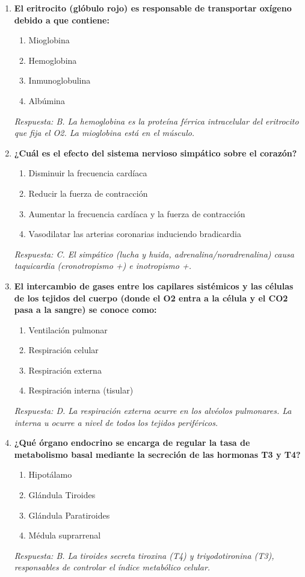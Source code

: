 \documentclass[spanish,letterpaper,oneside]{article}
\begin{document}
\begin{enumerate}[label=\textbf{\arabic*.}]
    \item \textbf{El eritrocito (glóbulo rojo) es responsable de transportar oxígeno debido a que contiene:}
    \begin{enumerate}
        \item[A)] Mioglobina
        \item[B)] Hemoglobina
        \item[C)] Inmunoglobulina
        \item[D)] Albúmina
    \end{enumerate}
    \textit{Respuesta: B. La hemoglobina es la proteína férrica intracelular del eritrocito que fija el O2. La mioglobina está en el músculo.}

    \item \textbf{¿Cuál es el efecto del sistema nervioso simpático sobre el corazón?}
    \begin{enumerate}
        \item[A)] Disminuir la frecuencia cardíaca
        \item[B)] Reducir la fuerza de contracción
        \item[C)] Aumentar la frecuencia cardíaca y la fuerza de contracción
        \item[D)] Vasodilatar las arterias coronarias induciendo bradicardia
    \end{enumerate}
    \textit{Respuesta: C. El simpático (lucha y huida, adrenalina/noradrenalina) causa taquicardia (cronotropismo +) e inotropismo +.}

    \item \textbf{El intercambio de gases entre los capilares sistémicos y las células de los tejidos del cuerpo (donde el O2 entra a la célula y el CO2 pasa a la sangre) se conoce como:}
    \begin{enumerate}
        \item[A)] Ventilación pulmonar
        \item[B)] Respiración celular
        \item[C)] Respiración externa
        \item[D)] Respiración interna (tisular)
    \end{enumerate}
    \textit{Respuesta: D. La respiración externa ocurre en los alvéolos pulmonares. La interna u ocurre a nivel de todos los tejidos periféricos.}

    \item \textbf{¿Qué órgano endocrino se encarga de regular la tasa de metabolismo basal mediante la secreción de las hormonas T3 y T4?}
    \begin{enumerate}
        \item[A)] Hipotálamo
        \item[B)] Glándula Tiroides
        \item[C)] Glándula Paratiroides
        \item[D)] Médula suprarrenal
    \end{enumerate}
    \textit{Respuesta: B. La tiroides secreta tiroxina (T4) y triyodotironina (T3), responsables de controlar el índice metabólico celular.}


\end{enumerate}
\end{document}
